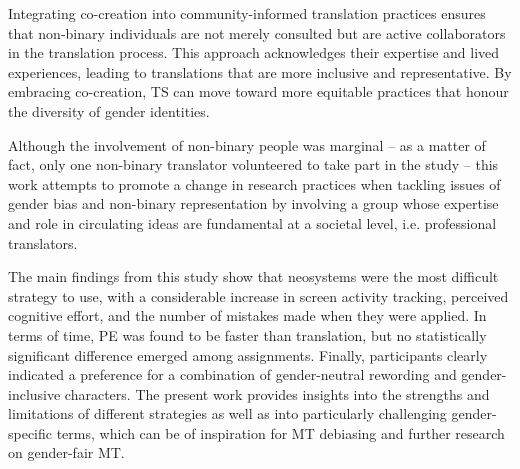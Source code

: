 Integrating co-creation into community-informed translation practices ensures that non-binary individuals are not merely consulted but are active collaborators in the translation process. This approach acknowledges their expertise and lived experiences, leading to translations that are more inclusive and representative. By embracing co-creation, TS can move toward more equitable practices that honour the diversity of gender identities.

Although the involvement of non-binary people was marginal -- as a matter of fact, only one non-binary translator volunteered to take part in the study -- this work attempts to promote a change in research practices when tackling issues of gender bias and non-binary representation by involving a group whose expertise and role in circulating ideas are fundamental at a societal level, i.e. professional translators. 


The main findings from this study show that neosystems were the most difficult strategy to use, with a considerable increase in screen activity tracking, perceived cognitive effort, and the number of mistakes made when they were applied. In terms of time, PE was found to be faster than translation, but no statistically significant difference emerged among assignments. Finally, participants clearly indicated a preference for a combination of gender-neutral rewording and gender-inclusive characters. The present work provides insights into the strengths and limitations of different strategies as well as into particularly challenging gender-specific terms, which can be of inspiration for MT debiasing and further research on gender-fair MT.

